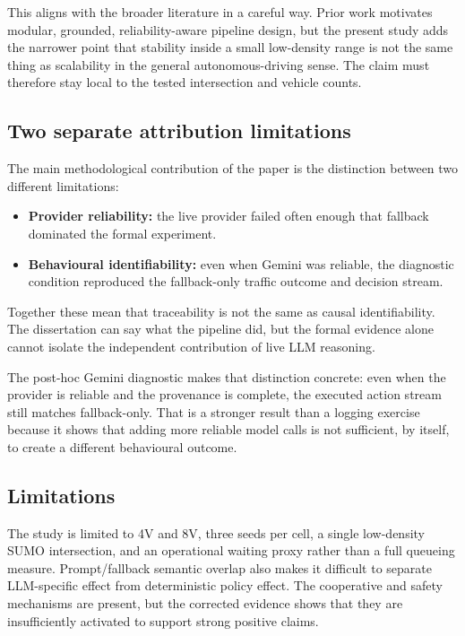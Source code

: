 \documentclass[letterpaper,10pt,conference]{ieeeconf}
\begin{document}
This aligns with the broader literature in a careful way. Prior work motivates modular, grounded, reliability-aware pipeline design, but the present study adds the narrower point that stability inside a small low-density range is not the same thing as scalability in the general autonomous-driving sense. The claim must therefore stay local to the tested intersection and vehicle counts.

\subsection{Two separate attribution limitations}
The main methodological contribution of the paper is the distinction between two different limitations:
\begin{itemize}
    \item \textbf{Provider reliability:} the live provider failed often enough that fallback dominated the formal experiment.
    \item \textbf{Behavioural identifiability:} even when Gemini was reliable, the diagnostic condition reproduced the fallback-only traffic outcome and decision stream.
\end{itemize}

Together these mean that traceability is not the same as causal identifiability. The dissertation can say what the pipeline did, but the formal evidence alone cannot isolate the independent contribution of live LLM reasoning.

The post-hoc Gemini diagnostic makes that distinction concrete: even when the provider is reliable and the provenance is complete, the executed action stream still matches fallback-only. That is a stronger result than a logging exercise because it shows that adding more reliable model calls is not sufficient, by itself, to create a different behavioural outcome.

\subsection{Limitations}
The study is limited to 4V and 8V, three seeds per cell, a single low-density SUMO intersection, and an operational waiting proxy rather than a full queueing measure. Prompt/fallback semantic overlap also makes it difficult to separate LLM-specific effect from deterministic policy effect. The cooperative and safety mechanisms are present, but the corrected evidence shows that they are insufficiently activated to support strong positive claims.
\end{document}
